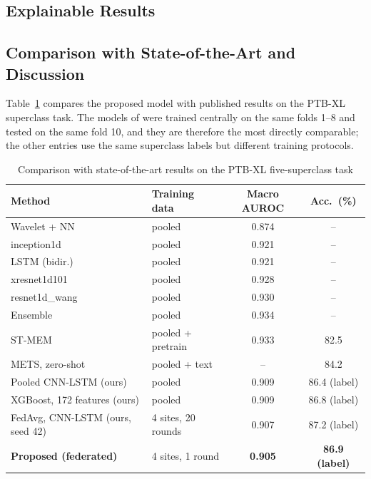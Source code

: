 \subsection{Explainable Results}
\label{sec:xai-results}



\subsection{Comparison with State-of-the-Art and Discussion}
\label{sec:discussion}

Table~\ref{tab:sota} compares the proposed model with published results on the PTB-XL superclass
task. The models of \cite{strodthoff2021} were trained centrally on the same folds 1--8 and tested on
the same fold 10, and they are therefore the most directly comparable; the other entries use the
same superclass labels but different training protocols.

\begin{table}[!t]
\centering
\caption{Comparison with state-of-the-art results on the PTB-XL five-superclass task}
\label{tab:sota}
\footnotesize
\setlength{\tabcolsep}{3pt}
\begin{tabular}{@{}p{3.2cm}p{1.6cm}cc@{}}
\toprule
Method & Training data & Macro AUROC & Acc.\ (\%) \\
\midrule
Wavelet + NN \cite{strodthoff2021} & pooled & 0.874 & -- \\
inception1d \cite{strodthoff2021} & pooled & 0.921 & -- \\
LSTM (bidir.) \cite{strodthoff2021} & pooled & 0.921 & -- \\
xresnet1d101 \cite{strodthoff2021} & pooled & 0.928 & -- \\
resnet1d\_wang \cite{strodthoff2021} & pooled & 0.930 & -- \\
Ensemble \cite{strodthoff2021} & pooled & 0.934 & -- \\
ST-MEM \cite{na2024stmem} & pooled + pretrain & 0.933 & 82.5 \\
METS, zero-shot \cite{li2023mets} & pooled + text & -- & 84.2 \\
\midrule
Pooled CNN-LSTM (ours) & pooled & 0.909 & 86.4 (label) \\
XGBoost, 172 features (ours) & pooled & 0.909 & 86.8 (label) \\
FedAvg, CNN-LSTM (ours, seed 42) & 4 sites, 20 rounds & 0.907 & 87.2 (label) \\
\textbf{Proposed (federated)} & 4 sites, 1 round & \textbf{0.905} & \textbf{86.9 (label)} \\
\bottomrule
\end{tabular}
\end{table}


